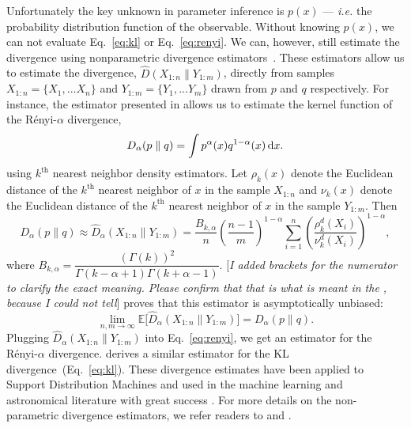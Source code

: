 \documentclass[12pt, letterpaper, preprint]{aastex}
\newcommand{\beq}{\begin{equation}}
\newcommand{\eeq}{\end{equation}}
\newcommand{\ms}[1]{{\color{orange}{\bf MS:}} {[\em #1}]}
\begin{document}
Unfortunately the key unknown in parameter inference is $p(x)$ --- \emph{i.e.} the probability 
distribution function of the observable.  Without knowing $p(x)$, we can not
evaluate Eq.~\ref{eq:kl} or Eq.~\ref{eq:renyi}. We can, however, 
still estimate the divergence using nonparametric divergence estimators~\citep{wang2009, poczos2012, krishnamurthy2014}. 
These estimators allow us to estimate the divergence, $\widehat{D}(X_{1:n} \parallel Y_{1:m})$, directly from 
samples $X_{1:n} = \{ X_1, ... X_n \}$ and $Y_{1:m} = \{ Y_1, ... Y_m \}$ 
drawn from $p$ and $q$ respectively.
For instance, the estimator presented in \cite{poczos2012} allows us to estimate 
the kernel function of the R\'enyi-$\alpha$ divergence,
\beq \label{eq:d_alpha}
D_{\alpha} ( p \parallel q ) = \int p^\alpha(x) q^{1-\alpha}(x)\,{\rm d}x. 
\eeq
using $k^\mathrm{th}$ nearest neighbor density estimators. Let $\rho_k(x)$ 
denote the Euclidean distance of the $k^\mathrm{th}$ nearest neighbor 
of $x$ in the sample $X_{1:n}$ and $\nu_k(x)$ denote the Euclidean distance 
of the $k^\mathrm{th}$ nearest neighbor of $x$ in the sample $Y_{1:m}$. Then 
\beq \label{eq:d_alpha_est}
D_{\alpha}(p \parallel q) \approx \widehat{D}_{\alpha}(X_{1:n} \parallel Y_{1:m}) = \frac{B_{k,\alpha}}{n} \left(\frac{n-1}{m}\right)^{1-\alpha}
\sum\limits_{i=1}^{n} \left(\frac{\rho_k^{d}(X_i)}{\nu_k^{d}(X_i)} \right)^{1-\alpha},
\eeq
where $B_{k, \alpha} = \dfrac{(\Gamma(k))^2}{\Gamma(k-\alpha+1)\Gamma(k+\alpha-1)}$. \ms{I added
brackets for the numerator to clarify the exact meaning. Please confirm that that
is what is meant in the \cite{poczos2012}, because I could not tell}
\cite{poczos2012} proves that this estimator is asymptotically unbiased: 
\beq
\lim_{n, m \rightarrow \infty} \mathbb{E} \big[ \widehat{D}_{\alpha} (X_{1:n} \parallel Y_{1:m}) \big] = D_{\alpha} (p \parallel q).
\eeq
Plugging $\widehat{D}_{\alpha}(X_{1:n} \parallel Y_{1:m})$ into Eq.~\ref{eq:renyi},
we get an estimator for the R\'enyi-$\alpha$ divergence. \cite{wang2009} derives
a similar estimator for the KL divergence~(Eq.~\ref{eq:kl}). 
These divergence estimates have been applied to Support Distribution Machines 
and used in the machine learning and astronomical literature with great success
\citep[\emph{e.g.}][]{poczos2011, poczos2012, poczos2012a, xu2013, ntampaka2015, ntampaka2016, ravanbakhsh2017a}. %
For more details on the non-parametric divergence estimators, we refer readers to 
\cite{poczos2012} and \cite{krishnamurthy2014}.
\end{document}
